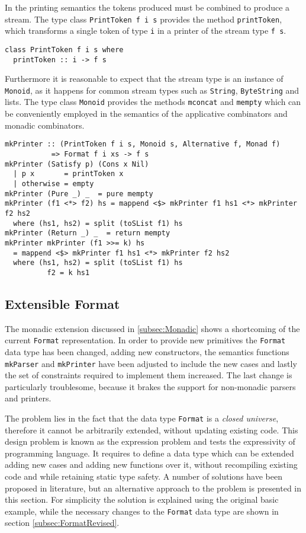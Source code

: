 \documentclass[../Thesis.tex]{subfiles}
\begin{document}
In the printing semantics the tokens produced must be combined to produce a stream. The type class \texttt{PrintToken f i s} provides the
method \texttt{printToken}, which transforms a single token
of type \texttt{i} in a printer of the stream type \texttt{f s}.
\begin{verbatim}
class PrintToken f i s where
  printToken :: i -> f s 
\end{verbatim}

Furthermore it is reasonable to expect that the stream type is 
an instance of \texttt{Monoid}, as it happens for common stream
types such as \texttt{String}, \texttt{ByteString} and lists.
The type class \texttt{Monoid} provides the methods 
\texttt{mconcat} and \texttt{mempty} which can be conveniently employed
in the semantics of the applicative combinators and monadic combinators.

\begin{verbatim}
mkPrinter :: (PrintToken f i s, Monoid s, Alternative f, Monad f) 
           => Format f i xs -> f s
mkPrinter (Satisfy p) (Cons x Nil)
  | p x       = printToken x
  | otherwise = empty
mkPrinter (Pure _) _  = pure mempty
mkPrinter (f1 <*> f2) hs = mappend <$> mkPrinter f1 hs1 <*> mkPrinter f2 hs2
  where (hs1, hs2) = split (toSList f1) hs
mkPrinter (Return _) _  = return mempty
mkPrinter mkPrinter (f1 >>= k) hs 
  = mappend <$> mkPrinter f1 hs1 <*> mkPrinter f2 hs2
  where (hs1, hs2) = split (toSList f1) hs
          f2 = k hs1			
\end{verbatim}

\subsection{Extensible Format}
\label{subsec:ExtensibleFormat}
The monadic extension discussed in \ref{subsec:Monadic} shows a shortcoming of the current \texttt{Format} representation.
In order to provide new primitives the \texttt{Format} data type 
has been changed, adding new constructors, the semantics functions \texttt{mkParser} and \texttt{mkPrinter} have been adjusted to include the new cases and lastly
the set of constraints required to implement them increased.
The last change is particularly troublesome, because it brakes the support for non-monadic parsers and printers.

The problem lies in the fact that the data type \texttt{Format} is
a \emph{closed universe}, therefore it cannot be arbitrarily extended,
without updating existing code.
This design problem is known as the expression problem \cite{Wadler98ExprPr} and tests the expressivity of programming language.
It requires to define a data type which can be extended adding new cases and adding new functions over it, without recompiling existing code and while retaining static type safety.
A number of solutions have been proposed in literature, but an alternative approach to the problem is presented in this section.
For simplicity the solution is explained using the original basic
example, while the necessary changes to the \texttt{Format} data type
are shown in section \ref{subsec:FormatRevised}.
\end{document}
